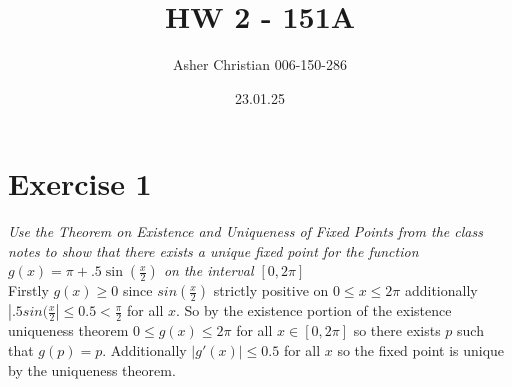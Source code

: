 \documentclass{amsart}
\title{HW 2 - 151A}
\author{Asher Christian 006-150-286}
\date{ 23.01.25}
\begin{document}
    \maketitle
    \section{Exercise 1}
    \emph{
        Use the Theorem on Existence and Uniqueness of Fixed Points from the class notes to show
        that there exists a unique fixed point for the function $g(x) = \pi + .5\sin(\frac{x}{2})$ on the interval $[0,2\pi]$
    }\\
    Firstly $g(x) \ge 0$ since $sin(\frac{x}{2})$ strictly positive on $0 \le x \le 2\pi$ additionally $|.5sin(\frac{x}{2}| \le 0.5 < \frac{\pi}{2}$ for all $x$.
    So by the existence portion of the existence uniqueness theorem $0 \le g(x) \le 2\pi$ for all $x \in [0,2\pi]$ so there exists $p$ such that
    $g(p) = p$. Additionally $|g'(x)| \le 0.5$ for all  $x$ so the fixed point is unique by the uniqueness theorem.
\end{document}
